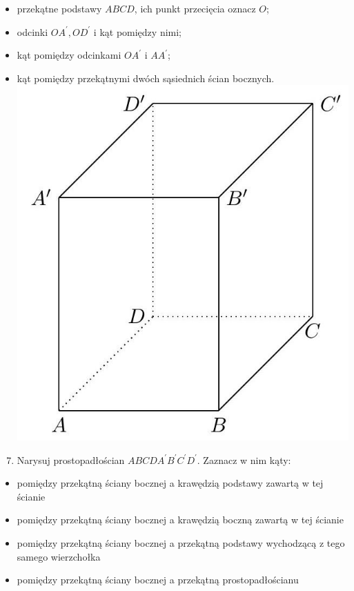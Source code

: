 \documentclass[10pt]{article}
\begin{document}
\begin{itemize}
  \item przekątne podstawy \(A B C D\), ich punkt przecięcia oznacz \(O\);
  \item odcinki \(O A^{\prime}, O D^{\prime}\) i kąt pomiędzy nimi;
  \item kąt pomiędzy odcinkami \(O A^{\prime}\) i \(A A^{\prime}\);
  \item kąt pomiędzy przekątnymi dwóch sąsiednich ścian bocznych.\\
\includegraphics[max width=\textwidth, center]{2024_11_21_e9b4faa005d5be2cc318g-073(1)}
\end{itemize}

\begin{enumerate}
  \setcounter{enumi}{6}
  \item Narysuj prostopadłościan \(A B C D A^{\prime} B^{\prime} C^{\prime} D^{\prime}\). Zaznacz w nim kąty:
\end{enumerate}

\begin{itemize}
  \item pomiędzy przekątną ściany bocznej a krawędzią podstawy zawartą w tej ścianie
  \item pomiędzy przekątną ściany bocznej a krawędzią boczną zawartą w tej ścianie
  \item pomiędzy przekątną ściany bocznej a przekątną podstawy wychodzącą z tego samego wierzchołka
  \item pomiędzy przekątną ściany bocznej a przekątną prostopadłościanu
\end{itemize}
\end{document}
